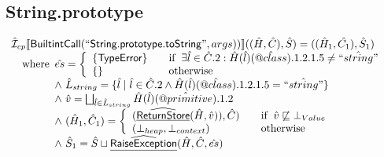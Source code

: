 \documentclass{article}
\makeatletter
\newcommand{\SF}[1]{\mbox{\textsf{#1}}}
\newcommand{\wherec}[1]{{\rm where}\begin{array}[t]{l}#1\end{array}}
\newcommand{\ifc}[1]{{\rm if}\begin{array}[t]{l}#1\end{array}}
\newcommand{\owc}{{\rm otherwise}}
\newcommand{\aI}{\hat{\mathcal{I}}}
\newcommand{\lbr}{\llbracket}
\newcommand{\rbr}{\rrbracket}
\newcommand{\ahf}[1]{\widehat{\underline{\sf #1}}}
\newcommand{\avarprop}[1]{\hat{@#1}}
\makeatother
\begin{document}
\subsection{String.prototype}
\[
\begin{array}{l}
\aI _{cp}\lbr \SF{BuiltintCall}(``\SF{String.prototype.toString}",args))\rbr((\hat{H},\hat{C}), \hat{S})
  = ((\hat{H}_1, \hat{C_1}), \hat{S}_1)\\
\quad\wherec{
  \hat{es} = \left\{\begin{array}{l@{\quad\quad}l}
      \{ \SF{TypeError} \}
      & \ifc{\exists \hat{l} \in \hat{C}.2 : \hat{H}(\hat{l})(\avarprop{class}).1.2.1.5  \neq \hat{``string"}}\\
      \{ \}& \owc\\
    \end{array}\right.\\
  \land\ \hat{L}_{string} = \{ \hat{l} \mid \hat{l} \in \hat{C}.2 \land \hat{H}(\hat{l})(\avarprop{class}).1.2.1.5  = \hat{``string"}\}\\
  \land\ \hat{v} = \bigsqcup_{\hat{l} \in \hat{L}_{string}} \hat{H}(\hat{l})(\avarprop{primitive}).1.2\\
  \land\ (\hat{H}_1, \hat{C}_1) = 
    \left\{\begin{array}{l@{\quad\quad}l}
      (\ahf{ReturnStore}(\hat{H}, \hat{v})), \hat{C})
      & \ifc{\hat{v} \not\sqsubseteq \bot_{Value}}\\
      (\bot_{heap}, \bot_{context}) & \owc \\
    \end{array}\right.\\
  \land\ \hat{S}_1 = \hat{S} \sqcup \ahf{RaiseException}(\hat{H}, \hat{C}, \hat{es})\\
  }\\
\\\\



\end{array}\]
\end{document}
